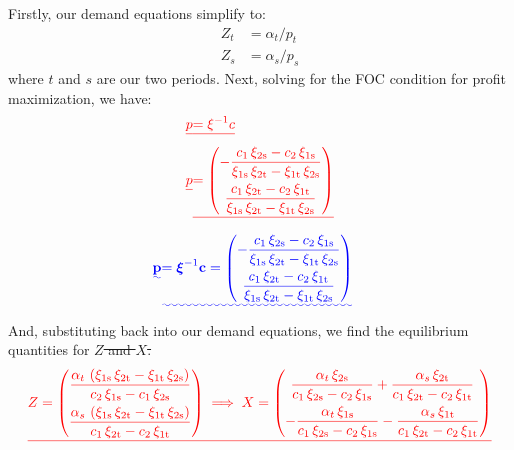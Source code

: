 \documentclass[11pt,a4paper,leqno]{extarticle}
\providecommand{\DIFadd}[1]{{\protect\color{blue}\uwave{#1}}} %
\providecommand{\DIFdel}[1]{{\protect\color{red}\sout{#1}}}                      %
\providecommand{\DIFaddbegin}{} %
\providecommand{\DIFaddend}{} %
\providecommand{\DIFdelbegin}{} %
\providecommand{\DIFdelend}{} %
\begin{document}
Firstly, our demand equations simplify to:
\begin{align}
Z_t &= \alpha_t / p_t \\
Z_s &= \alpha_s / p_s
\end{align}
where $t$ and $s$ are our two periods. Next, solving for the FOC condition for profit maximization, we have:
\DIFdelbegin \begin{eqnarray*}
	\DIFdel{p }&\DIFdel{=  \xi^{-1} c }\\
	\DIFdel{p }&\DIFdel{= \begin{pmatrix}
			-\dfrac{c_{1}\,\xi _{\mathrm{2s}}-c_{2}\,\xi _{\mathrm{1s}}}{\xi _{\mathrm{1s}}\,\xi _{\mathrm{2t}}-\xi _{\mathrm{1t}}\,\xi _{\mathrm{2s}}}  \\[2ex]
			\dfrac{c_{1}\,\xi _{\mathrm{2t}}-c_{2}\,\xi _{\mathrm{1t}}}{\xi _{\mathrm{1s}}\,\xi _{\mathrm{2t}}-\xi _{\mathrm{1t}}\,\xi _{\mathrm{2s}}} 
		\end{pmatrix} 
}\end{eqnarray*}%
\DIFdelend \DIFaddbegin \begin{align}
\DIFadd{\mathbf{p} }&\DIFadd{=  \boldsymbol{\xi}^{-1} \mathbf{c} = \begin{pmatrix}
	-\dfrac{c_{1}\,\xi _{\mathrm{2s}}-c_{2}\,\xi _{\mathrm{1s}}}{\xi _{\mathrm{1s}}\,\xi _{\mathrm{2t}}-\xi _{\mathrm{1t}}\,\xi _{\mathrm{2s}}}  \\[2ex]
	\dfrac{c_{1}\,\xi _{\mathrm{2t}}-c_{2}\,\xi _{\mathrm{1t}}}{\xi _{\mathrm{1s}}\,\xi _{\mathrm{2t}}-\xi _{\mathrm{1t}}\,\xi _{\mathrm{2s}}} 
	\end{pmatrix} 
}\end{align}\DIFaddend 
And, substituting back into our demand equations, we find the equilibrium quantities for \DIFdelbegin \DIFdel{$Z$ and $X$. 
}\begin{displaymath}
\DIFdel{Z = \begin{pmatrix}
	\dfrac{\alpha _{t}\,\left(\xi _{\mathrm{1s}}\,\xi _{\mathrm{2t}}-\xi _{\mathrm{1t}}\,\xi _{\mathrm{2s}}\right)}{c_{2}\,\xi _{\mathrm{1s}} - c_{1}\,\xi _{\mathrm{2s}}} \\[2ex]
	\dfrac{\alpha _{s}\,\left(\xi _{\mathrm{1s}}\,\xi _{\mathrm{2t}}-\xi _{\mathrm{1t}}\,\xi _{\mathrm{2s}}\right)}{c_{1}\,\xi _{\mathrm{2t}}-c_{2}\,\xi _{\mathrm{1t}}} 
	\end{pmatrix}
	\implies 
	X = \begin{pmatrix}
	\dfrac{\alpha _{t}\,\xi _{\mathrm{2s}}}{c_{1}\,\xi _{\mathrm{2s}}-c_{2}\,\xi _{\mathrm{1s}}}+\dfrac{\alpha _{s}\,\xi _{\mathrm{2t}}}{c_{1}\,\xi _{\mathrm{2t}}-c_{2}\,\xi _{\mathrm{1t}}} \\[2ex] 
	-\dfrac{\alpha _{t}\,\xi _{\mathrm{1s}}}{c_{1}\,\xi _{\mathrm{2s}}-c_{2}\,\xi _{\mathrm{1s}}}-\dfrac{\alpha _{s}\,\xi _{\mathrm{1t}}}{c_{1}\,\xi _{\mathrm{2t}}-c_{2}\,\xi _{\mathrm{1t}}}
	\end{pmatrix}
}\end{displaymath}%
\end{document}
